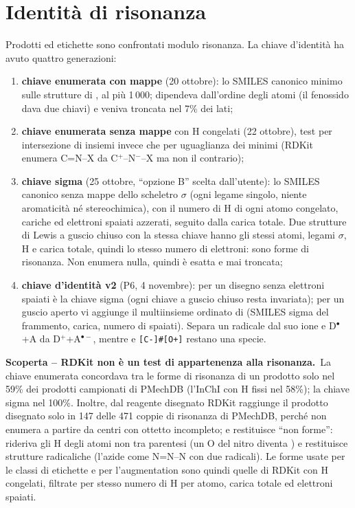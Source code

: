 \documentclass[11pt,a4paper]{report}
\newcommand{\code}[1]{\texttt{\detokenize{#1}}}
\newcommand{\scoperta}[2]{%
  \par\medskip\noindent\colorbox{ksgiallo}{\parbox{\dimexpr\linewidth-2\fboxsep\relax}{%
  \small\textbf{\color{ksrosso}Scoperta -- #1.}\ #2}}\par\medskip}
\begin{document}
\section{Identità di risonanza}
\label{sec:risonanza}
Prodotti ed etichette sono confrontati modulo risonanza. La chiave d'identità ha avuto quattro
generazioni:
\begin{enumerate}
\item \textbf{chiave enumerata con mappe} (20 ottobre): lo SMILES canonico minimo sulle strutture di
  \code{ResonanceMolSupplier}, al più 1\,000; dipendeva dall'ordine degli atomi (il fenossido dava due
  chiavi) e veniva troncata nel 7\% dei lati;
\item \textbf{chiave enumerata senza mappe} con H congelati (22 ottobre), test per intersezione di
  insiemi invece che per uguaglianza dei minimi (RDKit enumera C=N--X da C$^+$--N$^-$--X ma non il
  contrario);
\item \textbf{chiave sigma} (25 ottobre, \enquote{opzione B} scelta dall'utente): lo SMILES canonico
  senza mappe dello scheletro $\sigma$ (ogni legame singolo, niente aromaticità né stereochimica),
  con il numero di H di ogni atomo congelato, cariche ed elettroni spaiati azzerati, seguito dalla
  carica totale. Due strutture di Lewis a guscio chiuso con la stessa chiave hanno gli stessi atomi,
  legami $\sigma$, H e carica totale, quindi lo stesso numero di elettroni: sono forme di risonanza.
  Non enumera nulla, quindi è esatta e mai troncata;
\item \textbf{chiave d'identità v2} (P6, 4 novembre): per un disegno senza elettroni spaiati è la chiave
  sigma (ogni chiave a guscio chiuso resta invariata); per un guscio aperto vi aggiunge il multiinsieme
  ordinato di (SMILES sigma del frammento, carica, numero di spaiati). Separa un radicale dal suo ione e
  D$^\bullet$+A da D$^+$+A$^{\bullet-}$, mentre \code{[C]=O} e \texttt{[C-]\#[O+]} restano una specie.
\end{enumerate}

\scoperta{RDKit non è un test di appartenenza alla risonanza}{La chiave enumerata concordava tra le
forme di risonanza di un prodotto solo nel 59\% dei prodotti campionati di PMechDB (l'InChI con H fissi
nel 58\%); la chiave sigma nel 100\%. Inoltre, dal reagente disegnato RDKit raggiunge il prodotto
disegnato solo in 147 delle 471 coppie di risonanza di PMechDB, perché non enumera a partire da centri
con ottetto incompleto; e \code{ResonanceMolSupplier} restituisce \enquote{non forme}: rideriva gli H
degli atomi non tra parentesi (un O del nitro diventa \code{[OH2+]}) e restituisce strutture
radicaliche (l'azide come N=N--N con due radicali). Le forme usate per le classi di etichette e per
l'augmentation sono quindi quelle di RDKit con H congelati, filtrate per stesso numero di H per atomo,
carica totale ed elettroni spaiati.}
\end{document}
